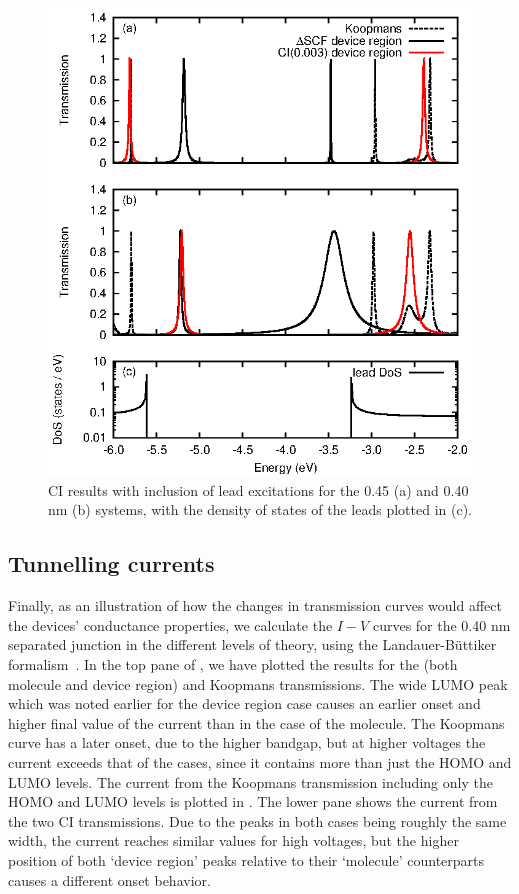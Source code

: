 \begin{figure}
	\begin{center}
		\includegraphics[width=0.9\linewidth]{figures/figure8a_8c}
	\end{center}
	\caption{CI results with inclusion of lead excitations for the
	         0.45 (a) and 0.40 nm (b) systems, with the density
		 of states of the leads plotted in (c).}
	\label{fig:cidevregion}
\end{figure}

\subsection{Tunnelling currents}
Finally, as an illustration of how the changes in transmission curves would
affect the devices' conductance properties, we calculate the $I-V$ curves
for the 0.40 nm separated junction in the different levels of theory,
using the Landauer-B\"uttiker formalism~\cite{buttiker1986}. In the top
pane of , we have plotted the results for the \dscf (both
molecule and device region) and Koopmans transmissions. The wide LUMO
peak which was noted earlier for the device region case causes an earlier
onset and higher final value of the current than in the case of the
molecule. The Koopmans curve has a later onset, due to the higher bandgap,
but at higher voltages the current exceeds that of the \dscf cases, since
it contains more than just the HOMO and LUMO levels. The current from
the Koopmans transmission including only the HOMO and LUMO levels is
plotted in . The lower pane shows the current from the two CI
transmissions. Due to the peaks in both cases being roughly the same
width, the current reaches similar values for high voltages, but the
higher position of both `device region' peaks relative to their `molecule'
counterparts causes a different onset behavior.

